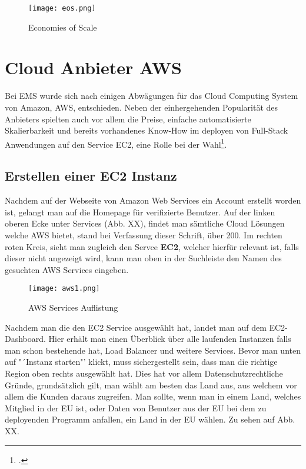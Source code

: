 \begin{center}
\begin{figure}[h]
    \centering
    \texttt{[image: eos.png]}
    \caption{Economies of Scale}
\end{figure}
\end{center}
\break

\section{Cloud Anbieter AWS}
Bei EMS wurde sich nach einigen Abwägungen für das Cloud Computing System von Amazon, AWS, entschieden. Neben der einhergehenden Popularität des Anbieters spielten auch vor allem die Preise, einfache automatisierte Skalierbarkeit und bereits vorhandenes Know-How im deployen von Full-Stack Anwendungen auf den Service EC2, eine Rolle bei der Wahl\footcite{deploy-nodejs1}.

\subsection{Erstellen einer EC2 Instanz}
Nachdem auf der Webseite von Amazon Web Services ein Account erstellt worden ist, gelangt man auf die Homepage für verifizierte Benutzer. Auf der linken oberen Ecke unter Services (Abb. XX), findet man sämtliche Cloud Lösungen welche AWS bietet, stand bei Verfassung dieser Schrift, über 200. Im rechten roten Kreis, sieht man zugleich den Servce \textbf{EC2}, welcher hierfür relevant ist, falls dieser nicht angezeigt wird, kann man oben in der Suchleiste den Namen des gesuchten AWS Services eingeben.

\begin{center}
\begin{figure}[h]
    \centering
    \texttt{[image: aws1.png]}
    \caption{AWS Services Auflistung}
\end{figure}
\end{center}

Nachdem man die den EC2 Service ausgewählt hat, landet man auf dem EC2-Dashboard. Hier erhält man einen Überblick über alle laufenden Instanzen falls man schon bestehende hat, Load Balancer und weitere Services. Bevor man unten auf "´Instanz starten"' klickt, muss sichergestellt sein, dass man die richtige Region oben rechts ausgewählt hat. Dies hat vor allem Datenschutzrechtliche Gründe, grundsätzlich gilt, man wählt am besten das Land aus, aus welchem vor allem die Kunden daraus zugreifen. Man sollte, wenn man in einem Land, welches Mitglied in der EU ist, oder Daten von Benutzer aus der EU bei dem zu deployenden Programm anfallen, ein Land in der EU wählen. Zu sehen auf Abb. XX.

